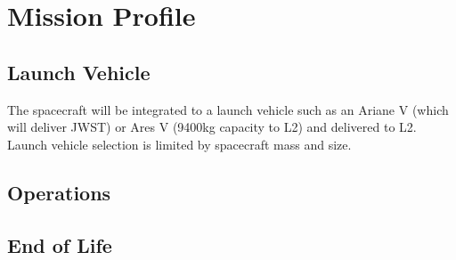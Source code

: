 \documentclass{ws-jai}
\begin{document}
\section{Mission Profile}
\label{sec:mission-profile}
\subsection{Launch Vehicle}
\label{subsec:launch}
The spacecraft will be integrated to a launch vehicle such as an Ariane V (which will deliver JWST) or Ares V (9400kg capacity to L2) and delivered to L2.
Launch vehicle selection is limited by spacecraft mass and size.

\subsection{Operations}
\subsection{End of Life}
\end{document}

